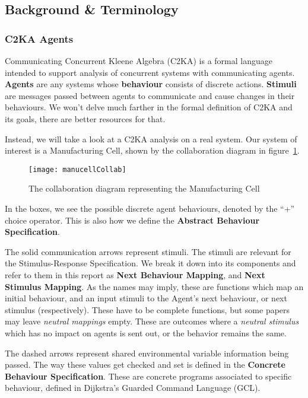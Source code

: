 \subsection{Background \& Terminology}\label{subsec:background-&-terminology}
\subsubsection{C2KA Agents}\label{subsubsec:c2ka-agents}
Communicating Concurrent Kleene Algebra (C2KA) is a formal language intended to support analysis of concurrent systems with communicating agents. %
\textbf{Agents} are any systems whose \textbf{behaviour} consists of discrete actions.
\textbf{Stimuli} are messages passed between agents to communicate and cause changes in their behaviours.
We won't delve much farther in the formal definition of C2KA and its goals, there are better resources for that. %

Instead, we will take a look at a C2KA analysis on a real system.
Our system of interest is a Manufacturing Cell, shown by the collaboration diagram in figure~\ref{fig:manucell-collab}.
\begin{figure}
    \centering
    \texttt{[image: manucellCollab]}
    \caption{The collaboration diagram representing the Manufacturing Cell}
    \label{fig:manucell-collab}
\end{figure}

In the boxes, we see the possible discrete agent behaviours, denoted by the ``+'' choice operator.
This is also how we define the \textbf{Abstract Behaviour Specification}. %

The solid communication arrows represent stimuli.
The stimuli are relevant for the Stimulus-Response Specification. %
We break it down into its components and refer to them in this report as \textbf{Next Behaviour Mapping}, and \textbf{Next Stimulus Mapping}.
As the names may imply, these are functions which map an initial behaviour, and an input stimuli to the Agent's next behaviour, or next stimulus (respectively).
These have to be complete functions, but some papers may leave \textit{neutral mappings} empty.
These are outcomes where a \textit{neutral stimulus} which has no impact on agents is sent out, or the behavior remains the same.

The dashed arrows represent shared environmental variable information being passed.
The way these values get checked and set is defined in the \textbf{Concrete Behaviour Specification}. %
These are concrete programs associated to specific behaviour, defined in Dijkstra's Guarded Command Language (GCL).

